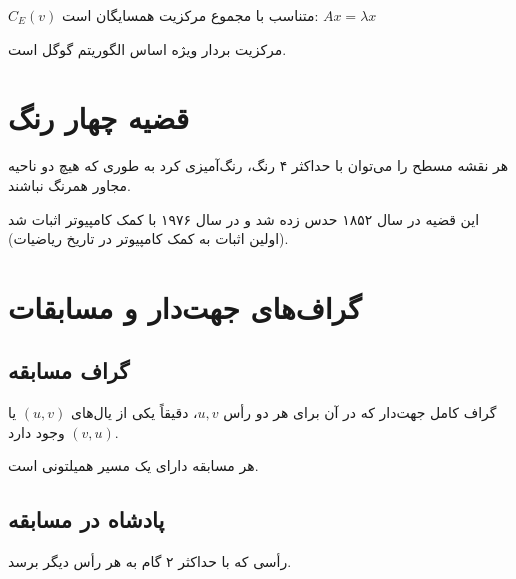 \documentclass{matinbook}
\begin{document}
    \begin{definition}
        $C_{E}(v)$ متناسب با مجموع
        مرکزیت همسایگان است:
        $Ax = \lambda x$
        \label{def:eigenvector-centrality}
    \end{definition}
    
    مرکزیت بردار ویژه اساس
    الگوریتم 
    گوگل است.
    
    \section{قضیه چهار رنگ}
    
    \begin{theorem}
        هر نقشه مسطح را می‌توان
        با حداکثر ۴ رنگ، رنگ‌آمیزی کرد
        به طوری که هیچ دو ناحیه مجاور
        همرنگ نباشند.
        \label{thm:four-color}
    \end{theorem}
    
    این قضیه در سال ۱۸۵۲ حدس زده شد
    و در سال ۱۹۷۶ با کمک کامپیوتر
    اثبات شد (اولین اثبات به کمک کامپیوتر
    در تاریخ ریاضیات).
    
    \section{گراف‌های جهت‌دار و مسابقات}
    
    \subsection{گراف مسابقه}
    
    \begin{definition}[مسابقه]
        گراف کامل جهت‌دار که در آن
        برای هر دو رأس $u, v$،
        دقیقاً یکی از یال‌های $(u, v)$
        یا $(v, u)$ وجود دارد.
        \label{def:tournament}
    \end{definition}
    
    \begin{theorem}
        هر مسابقه دارای یک مسیر همیلتونی است.
        \label{thm:landau}
    \end{theorem}
    
    \subsection{پادشاه در مسابقه}
    
    \begin{definition}[پادشاه]
        رأسی که با حداکثر ۲ گام
        به هر رأس دیگر برسد.
        \label{def:king}
    \end{definition}
    
\end{document}
